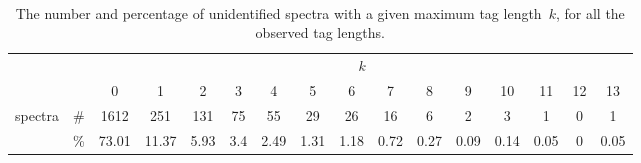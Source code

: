 \documentclass{article}
\begin{document}
\begin{landscape}

\begin{table}[h]
\vspace{3mm}\
{\centering
\begin{center}
\begin{tabular}{|c|c|
c|c|c|c|c|c|c|c|c|c|c|c|c|c|}
  \hline
  \multicolumn{2}{|c|}{} & \multicolumn{ 14}{|c|}{$k$} \\
  \cline{3-16}
  \multicolumn{2}{|c|}{} 
 & 0 & 1 & 2 & 3 & 4 & 5 & 6 & 7 & 8 & 9 & 10 & 11 & 12 & 13\\
  \hline
  \multirow{2}{*}{spectra} & \#
 & 1612 & 251 & 131 & 75 & 55 & 29 & 26 & 16 & 6 & 2 & 3 & 1 & 0 & 1\\
   & \%
 & 73.01 & 11.37 & 5.93 & 3.4 & 2.49 & 1.31 & 1.18 & 0.72 & 0.27 & 0.09 & 0.14 & 0.05 & 0 & 0.05\\
  \hline
\end{tabular}
\end{center}
\par}
\centering
\caption{The number and percentage of unidentified spectra with a given maximum tag length~$k$, for all the observed tag lengths.}
\vspace{3mm}
\label{table:unident-tags}
\end{table}
\end{landscape}
\end{document}
